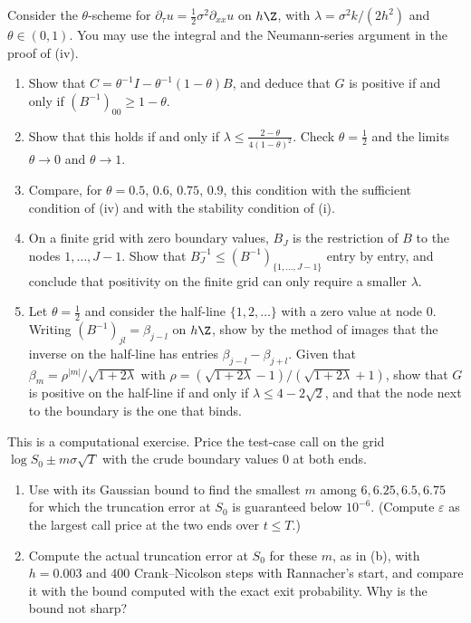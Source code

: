 \begin{exercise}\label{ex:fd-theta-positivity}
\medium Consider the $\theta$-scheme for $\partial_\tau u=\frac12\sigma^2\partial_{xx}u$ on $h\Z$, with $\lambda=\sigma^2k/(2h^2)$ and
$\theta\in(0,1)$. You may use the integral and the Neumann-series argument in the proof of
(iv).
\begin{enumerate}[label=(\alph*)]
  \item Show that $C=\theta^{-1}I-\theta^{-1}(1-\theta)B$, and deduce that $G$ is positive if and only if
    $(B^{-1})_{00}\ge1-\theta$.
  \item Show that this holds if and only if $\lambda\le\frac{2-\theta}{4(1-\theta)^2}$. Check $\theta=\frac12$ and the limits
    $\theta\to0$ and $\theta\to1$.
  \item Compare, for $\theta=0.5$, $0.6$, $0.75$, $0.9$, this condition with the sufficient condition of
    (iv) and with the stability condition of (i).
  \item On a finite grid with zero boundary values, $B_J$ is the restriction of $B$ to the nodes
    $1,\dots,J-1$. Show that $B_J^{-1}\le(B^{-1})_{\{1,\dots,J-1\}}$ entry by entry, and conclude that positivity on
    the finite grid can only require a smaller $\lambda$.
  \item Let $\theta=\frac12$ and consider the half-line $\{1,2,\dots\}$ with a zero value at node $0$. Writing
    $(B^{-1})_{jl}=\beta_{j-l}$ on $h\Z$, show by the method of images that the inverse on the half-line has
    entries $\beta_{j-l}-\beta_{j+l}$. Given that $\beta_m=\rho^{|m|}/\sqrt{1+2\lambda}$ with
    $\rho=(\sqrt{1+2\lambda}-1)/(\sqrt{1+2\lambda}+1)$, show that $G$ is positive on the half-line if and only if
    $\lambda\le4-2\sqrt2$, and that the node next to the boundary is the one that binds.
\end{enumerate}
\end{exercise}

\begin{exercise}\label{ex:fd-boundary-width}
\easy This is a computational exercise. Price the test-case call on the grid
$\log S_0\pm m\sigma\sqrt T$ with the crude boundary values $0$ at both ends.
\begin{enumerate}[label=(\alph*)]
  \item Use  with its Gaussian bound to find the smallest $m$ among
    $6,6.25,6.5,6.75$ for which the truncation error at $S_0$ is guaranteed below $10^{-6}$. (Compute $\varepsilon$
    as the largest call price at the two ends over $t\le T$.)
  \item Compute the actual truncation error at $S_0$ for these $m$, as in
    (b), with $h=0.003$ and $400$ Crank--Nicolson steps with Rannacher's
    start, and compare it with the bound computed with the exact exit probability. Why is the
    bound not sharp?
\end{enumerate}
\end{exercise}

